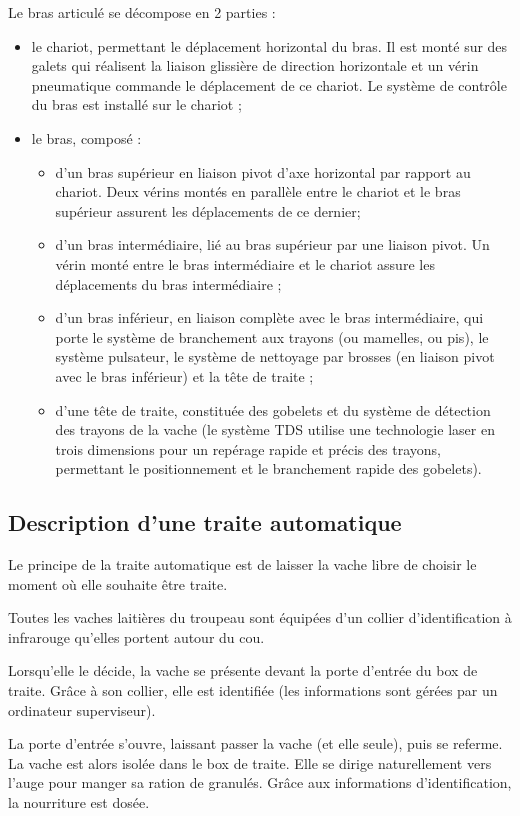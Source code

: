 Le bras articulé se décompose en 2 parties :
\begin{itemize}
 \item le chariot, permettant le déplacement horizontal du bras. Il est monté sur des galets qui réalisent la liaison glissière de direction horizontale et un vérin pneumatique commande le déplacement de ce chariot. Le système de contrôle du bras est installé sur le chariot ;
 \item le bras, composé :
 \begin{itemize}
  \item d’un bras supérieur en liaison pivot d’axe horizontal par rapport au chariot. Deux vérins montés en parallèle entre le chariot et le bras supérieur assurent les déplacements de ce dernier;
  \item d’un bras intermédiaire, lié au bras supérieur par une liaison pivot. Un vérin monté entre le bras intermédiaire et le chariot assure les déplacements du bras intermédiaire ;
  \item d’un bras inférieur, en liaison complète avec le bras intermédiaire, qui porte le système de branchement aux trayons (ou mamelles, ou pis), le système pulsateur, le système de nettoyage par brosses (en liaison pivot avec le bras inférieur) et la tête de traite ;
  \item d’une tête de traite, constituée des gobelets et du système de détection des trayons de la vache (le système TDS utilise une technologie laser en trois dimensions pour un repérage rapide et précis des trayons, permettant le positionnement et le branchement rapide des gobelets).
\end{itemize}
\end{itemize}

\subsection{Description d’une traite automatique}

Le principe de la traite automatique est de laisser la vache libre de choisir le moment où elle souhaite être traite.

Toutes les vaches laitières du troupeau sont équipées d’un collier d’identification à infrarouge qu’elles portent autour du cou.

Lorsqu’elle le décide, la vache se présente devant la porte d’entrée du box de traite. Grâce à son collier, elle est identifiée (les informations sont gérées par un ordinateur superviseur).

La porte d’entrée s’ouvre, laissant passer la vache (et elle seule), puis se referme. La vache est alors isolée dans le box de traite. Elle se dirige naturellement vers l’auge pour manger sa ration de granulés. Grâce aux informations d’identification, la nourriture est dosée.

